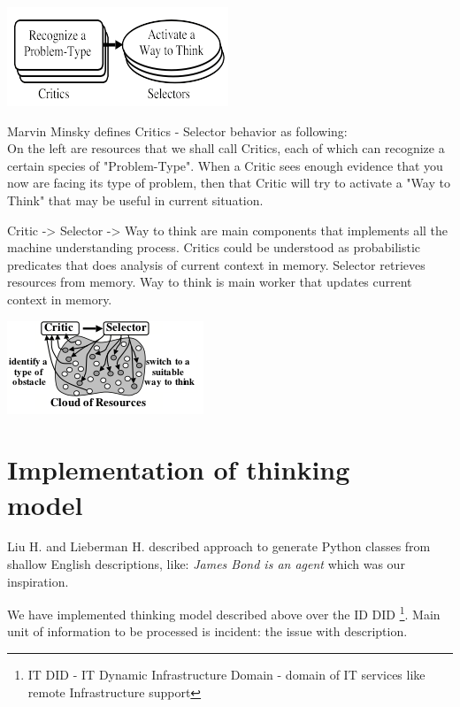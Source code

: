 \documentclass[conference]{IEEEtran}
\begin{document}
\includegraphics{critic_selector_model.png}

Marvin Minsky defines Critics - Selector behavior as following:\\
On the left are resources that we shall call Critics, each of which can recognize a certain species of "Problem-Type". When a Critic sees enough evidence that you now are facing its type of problem, then that Critic will try to activate a "Way to Think" that may be useful in current situation.

Critic -> Selector -> Way to think are main components that implements all the machine understanding process. Critics could be understood as probabilistic predicates that does analysis of current context in memory. Selector retrieves resources from memory. Way to think is main worker that updates current context in memory.

\includegraphics{critic_selector.png}

\section{Implementation of thinking\\ model}

Liu H. and Lieberman H.\cite{stories} described approach to generate Python classes from shallow English descriptions, like: \emph{James Bond is an agent} which was our inspiration.

We have implemented thinking model described above over the ID DID \footnote{IT DID - IT Dynamic Infrastructure Domain - domain of IT services like remote Infrastructure support}. Main unit of information to be processed is incident: the issue with description.
\end{document}
